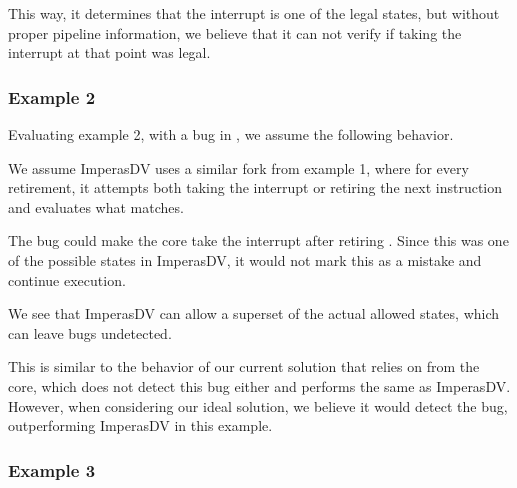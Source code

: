 This way, it determines that the interrupt is one of the legal states, but without proper pipeline information, we believe that it can not verify if taking the interrupt at that point was legal.

\subsubsection{Example 2}

Evaluating example 2, with a bug in , we assume the following behavior. 

We assume ImperasDV uses a similar fork from example 1, where for every retirement, it attempts both taking the interrupt or retiring the next instruction and evaluates what matches. 

The bug could make the core take the interrupt after retiring . Since this was one of the possible states in ImperasDV, it would not mark this as a mistake and continue execution.

We see that ImperasDV can allow a superset of the actual allowed states, which can leave bugs undetected.

This is similar to the behavior of our current solution that relies on  from the core, which does not detect this bug either and performs the same as ImperasDV. 
However, when considering our ideal solution, we believe it would detect the bug, outperforming ImperasDV in this example.




\subsubsection{Example 3}

